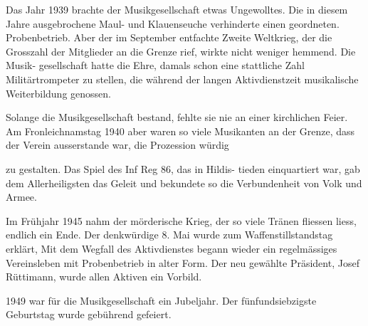 \begin{multicols}{2}
    Das Jahr 1939 brachte der Musikgesellschaft etwas
    Ungewolltes. Die in diesem Jahre ausgebrochene Maul-
    und Klauenseuche verhinderte einen geordneten.
    Probenbetrieb. Aber der im September entfachte Zweite
    Weltkrieg, der die Grosszahl der Mitglieder an die
    Grenze rief, wirkte nicht weniger hemmend. Die Musik-
    gesellschaft hatte die Ehre, damals schon eine
    stattliche Zahl Militärtrompeter zu stellen, die während
    der langen Aktivdienstzeit musikalische Weiterbildung
    genossen.

    Solange die Musikgesellschaft bestand, fehlte sie nie
    an einer kirchlichen Feier. Am Fronleichnamstag 1940
    aber waren so viele Musikanten an der Grenze, dass
    der Verein ausserstande war, die Prozession würdig

    zu gestalten. Das Spiel des Inf Reg 86, das in Hildis-
    tieden einquartiert war, gab dem Allerheiligsten das
    Geleit und bekundete so die Verbundenheit von Volk
    und Armee.

    Im Frühjahr 1945 nahm der mörderische Krieg, der
    so viele Tränen fliessen liess, endlich ein Ende. Der
    denkwürdige 8. Mai wurde zum Waffenstillstandstag
    erklärt, Mit dem Wegfall des Aktivdienstes begann
    wieder ein regelmässiges Vereinsleben mit Probenbetrieb
    in alter Form. Der neu gewählte Präsident, Josef
    Rüttimann, wurde allen Aktiven ein Vorbild.

    1949 war für die Musikgesellschaft ein Jubeljahr. Der
    fünfundsiebzigste Geburtstag wurde gebührend gefeiert.


\end{multicols}

